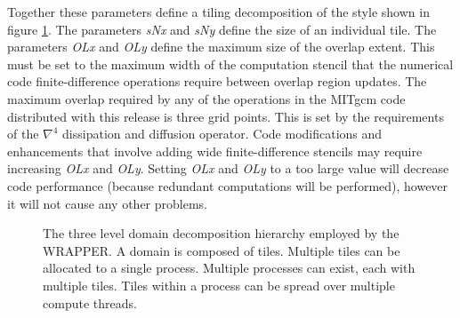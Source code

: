 Together these parameters define a tiling decomposition of the style shown in 
figure \ref{fig:labelled_tile}. The parameters {\em sNx} and {\em sNy} define
the size of an individual tile. The parameters {\em OLx} and {\em OLy} define the
maximum size of the overlap extent. This must be set to the maximum width
of the computation stencil that the numerical code finite-difference operations
require between overlap region updates. The maximum overlap required
by any of the operations in the MITgcm code distributed with this release is three grid
points. This is set by the requirements of the $\nabla^4$ dissipation and 
diffusion operator. Code modifications and enhancements that involve adding wide 
finite-difference stencils may require increasing {\em OLx} and {\em OLy}.
Setting {\em OLx} and {\em OLy} to a too large value will decrease code
performance (because redundant computations will be performed), however it will
not cause any other problems.

\begin{figure}
\begin{center}
\end{center}
\caption{ The three level domain decomposition hierarchy employed by the
WRAPPER. A domain is composed of tiles. Multiple tiles can be allocated
to a single process. Multiple processes can exist, each with multiple tiles.
Tiles within a process can be spread over multiple compute threads.
} \label{fig:labelled_tile}
\end{figure}

